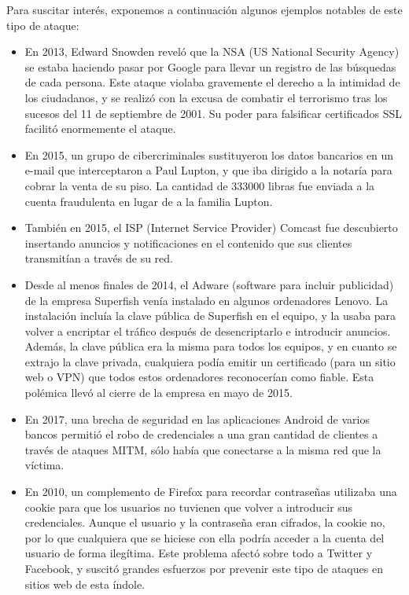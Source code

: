 \documentclass[11pt]{article}
\begin{document}
Para suscitar interés, exponemos a continuación algunos ejemplos notables de este tipo de ataque:
\begin{itemize}
	\item En 2013, Edward Snowden reveló que la NSA (US National Security Agency) se estaba haciendo pasar por Google para llevar un
	registro de las búsquedas de cada persona. Este ataque violaba gravemente el derecho a la intimidad de los ciudadanos, y se realizó con
	la excusa de combatir el terrorismo tras los sucesos del 11 de septiembre de 2001. Su poder para falsificar certificados SSL facilitó
	enormemente el ataque.
	
	\item En 2015, un grupo de cibercriminales sustituyeron los datos bancarios en un e-mail que interceptaron a Paul Lupton, y que iba dirigido
	a la notaría para cobrar la venta de su piso. La cantidad de 333000 libras fue enviada a la cuenta fraudulenta en lugar de a la familia Lupton.
	
	\item También en 2015, el ISP (Internet Service Provider) Comcast fue descubierto insertando anuncios y notificaciones en el contenido
	que sus clientes transmitían a través de su red.
	
	\item Desde al menos finales de 2014, el Adware (software para incluir publicidad) de la empresa Superfish venía instalado en algunos ordenadores
	Lenovo. La instalación incluía la clave pública de Superfish en el equipo, y la usaba para volver a encriptar el tráfico después de desencriptarlo
	e introducir anuncios. Además, la clave pública era la misma para todos los equipos, y en cuanto se extrajo la clave privada, cualquiera podía
	emitir un certificado (para un sitio web o VPN) que todos estos ordenadores reconocerían como fiable. Esta polémica llevó al cierre de la empresa
	en mayo de 2015.
	
	\item En 2017, una brecha de seguridad en las aplicaciones Android de varios bancos permitió el robo de credenciales a una gran cantidad de clientes
	a través de ataques MITM, sólo había que conectarse a la misma red que la víctima.
	
	\item En 2010, un complemento de Firefox para recordar contraseñas utilizaba una cookie para que los usuarios no tuvienen que volver a introducir
	sus credenciales. Aunque el usuario y la contraseña eran cifrados, la cookie no, por lo que cualquiera que se hiciese con ella podría acceder
	a la cuenta del usuario de forma ilegítima. Este problema afectó sobre todo a Twitter y Facebook, y suscitó grandes esfuerzos por prevenir este tipo
	 de ataques en sitios web de esta índole.
\end{itemize}
\end{document}
